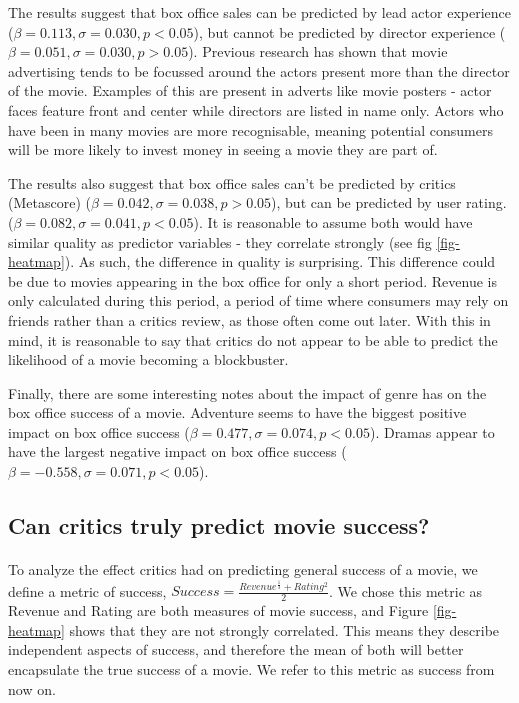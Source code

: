         The results suggest that box office sales can be predicted by lead actor experience ($\beta=0.113, \sigma=0.030, p<0.05$),
            but cannot be predicted by director experience ($\beta=0.051, \sigma=0.030, p>0.05$).
        Previous research has shown that movie advertising tends to be focussed around the actors 
            present more than the director of the movie\cite{elberse2007power}.
        Examples of this are present in adverts like movie posters - actor faces feature front and 
            center while directors are listed in name only.
        Actors who have been in many movies are more recognisable, meaning potential consumers
            will be more likely to invest money in seeing a movie they are part of.

        The results also suggest that box office sales can't be predicted by critics (Metascore) 
            ($\beta=0.042, \sigma=0.038, p>0.05$), but can be predicted by user rating.
            ($\beta=0.082, \sigma=0.041, p<0.05$).
        It is reasonable to assume both would have similar quality as predictor variables - they 
            correlate strongly (see fig \ref{fig-heatmap}).
        As such, the difference in quality is surprising.
        This difference could be due to movies appearing in the box office for only a short period.
        Revenue is only calculated during this period, a period of time where consumers may 
            rely on friends rather than a critics review, as those often come out later.
        With this in mind, it is reasonable to say that critics do not appear to be able to predict the likelihood
            of a movie becoming a blockbuster.
        
        Finally, there are some interesting notes about the impact of genre has on the box office success of a movie.
        Adventure seems to have the biggest positive impact on box office success ($\beta=0.477,\sigma=0.074,p<0.05$).
        Dramas appear to have the largest negative impact on box office success ($\beta=-0.558,\sigma=0.071,p<0.05$).
    \subsection{Can critics truly predict movie success?}
        \paragraph{}
        To analyze the effect critics had on predicting general success of a movie, we define
            a metric of success, $Success = \frac{Revenue^\frac{1}{3} + Rating^2}{2}$.
        We chose this metric as Revenue and Rating are both measures of movie success,
            and Figure \ref{fig-heatmap} shows that they are not strongly correlated.
        This means they describe independent aspects of success, and therefore the mean of both
            will better encapsulate the true success of a movie.
        We refer to this metric as success from now on.
        
